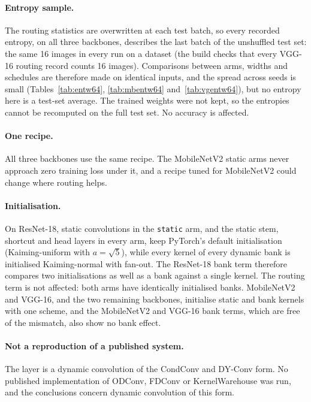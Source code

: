 \documentclass[10pt,a4paper]{article}
\begin{document}
\paragraph{Entropy sample.} The routing statistics are overwritten at each
test batch, so every recorded entropy, on all three backbones, describes
the last batch of the unshuffled test set: the same 16 images in every run
on a dataset (the build checks that every VGG-16 routing record counts 16
images). Comparisons between arms, widths and schedules are therefore made
on identical inputs, and the spread across seeds is small
(Tables~\ref{tab:entw64}, \ref{tab:mbentw64} and~\ref{tab:vgentw64}), but no
entropy here is a test-set average. The trained weights were not kept, so
the entropies cannot be recomputed on the full test set. No accuracy is
affected.

\paragraph{One recipe.} All three backbones use the same recipe. The
MobileNetV2 static arms never approach zero training loss under it, and a
recipe tuned for MobileNetV2 could change where routing helps.

\paragraph{Initialisation.} On ResNet-18, static convolutions in the
\texttt{static} arm, and the static stem, shortcut and head layers in
every arm, keep PyTorch's default initialisation (Kaiming-uniform with
$a=\sqrt5$), while every kernel of every dynamic bank is initialised
Kaiming-normal with fan-out. The ResNet-18 bank term therefore compares
two initialisations as well as a bank against a single kernel. The routing
term is not affected: both arms have identically initialised banks.
MobileNetV2 and VGG-16, and the two remaining backbones, initialise static
and bank kernels with one scheme, and the MobileNetV2 and VGG-16 bank
terms, which are free of the mismatch, also show no bank effect.

\paragraph{Not a reproduction of a published system.} The layer is a
dynamic convolution of the CondConv and DY-Conv form. No published
implementation of ODConv, FDConv or KernelWarehouse was run, and the
conclusions concern dynamic convolution of this form.
\end{document}
